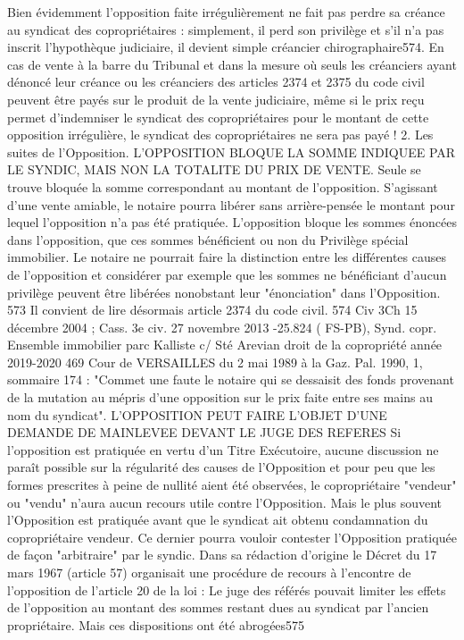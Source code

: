Bien évidemment l’opposition faite irrégulièrement ne fait pas perdre sa créance au syndicat des copropriétaires : simplement, il perd son privilège et s’il n’a pas inscrit l’hypothèque judiciaire, il devient simple créancier chirographaire574.
En cas de vente à la barre du Tribunal et dans la mesure où seuls les créanciers ayant dénoncé leur créance ou les créanciers des articles 2374 et 2375 du code civil peuvent être payés sur le produit de la vente judiciaire, même si le prix reçu permet d’indemniser le syndicat des copropriétaires pour le montant de cette opposition irrégulière, le syndicat des copropriétaires ne sera pas payé !
2. Les suites de l'Opposition.
L’OPPOSITION BLOQUE LA SOMME INDIQUEE PAR LE SYNDIC, MAIS NON LA TOTALITE DU PRIX DE VENTE.
Seule se trouve bloquée la somme correspondant au montant de l'opposition. S'agissant d'une vente amiable, le notaire pourra libérer sans arrière-pensée le montant pour lequel l'opposition n'a pas été pratiquée.
L'opposition bloque les sommes énoncées dans l'opposition, que ces sommes bénéficient ou non du Privilège spécial immobilier.
Le notaire ne pourrait faire la distinction entre les différentes causes de l'opposition et considérer par exemple que les sommes ne bénéficiant d'aucun privilège peuvent être libérées nonobstant leur "énonciation" dans l’Opposition.
573 Il convient de lire désormais article 2374 du code civil.
574 Civ 3\degres Ch 15 décembre 2004 ; Cass. 3e civ. 27 novembre 2013 -25.824 ( FS-PB), Synd. copr. Ensemble immobilier parc Kalliste c/ Sté Arevian
droit de la copropriété année 2019-2020
469
Cour de VERSAILLES du 2 mai 1989 à la Gaz. Pal. 1990, 1, sommaire 174 :
"Commet une faute le notaire qui se dessaisit des fonds provenant de la mutation au mépris d'une opposition sur le prix faite entre ses mains au nom du syndicat".
L’OPPOSITION PEUT FAIRE L’OBJET D’UNE DEMANDE DE MAINLEVEE DEVANT LE JUGE DES REFERES
Si l'opposition est pratiquée en vertu d'un Titre Exécutoire, aucune discussion ne paraît possible sur la régularité des causes de l'Opposition et pour peu que les formes prescrites à peine de nullité aient été observées, le copropriétaire "vendeur" ou "vendu" n'aura aucun recours utile contre l'Opposition.
Mais le plus souvent l'Opposition est pratiquée avant que le syndicat ait obtenu condamnation du copropriétaire vendeur. Ce dernier pourra vouloir contester l'Opposition pratiquée de façon "arbitraire" par le syndic.
Dans sa rédaction d'origine le Décret du 17 mars 1967 (article 57) organisait une procédure de recours à l'encontre de l'opposition de l'article 20 de la loi : Le juge des référés pouvait limiter les effets de l'opposition au montant des sommes restant dues au syndicat par l'ancien propriétaire. Mais ces dispositions ont été abrogées575
